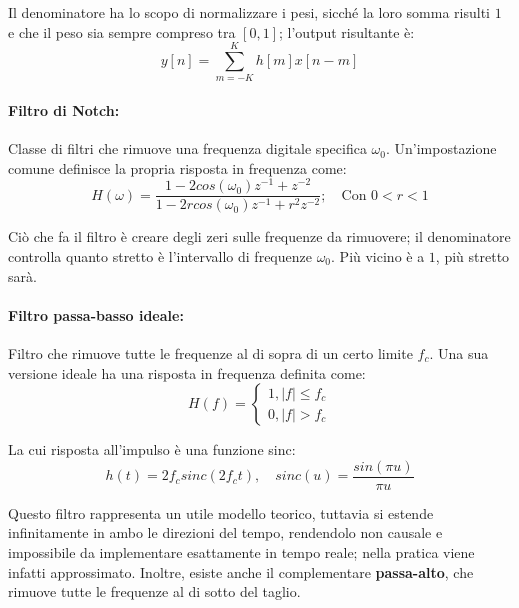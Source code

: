 \noindent Il denominatore ha lo scopo di normalizzare i pesi, sicché la loro somma risulti $1$ e che il peso sia sempre compreso tra $[0,1]$; l'output
risultante è: \[
	y[n] = \sum_{m = -K}^K h[m]x[n-m]
\]

\paragraph{Filtro di Notch:} Classe di filtri che rimuove una frequenza digitale specifica $\omega_0$. Un'impostazione comune definisce la propria
risposta in frequenza come: \[
	H(\omega) = \frac{1-2cos(\omega_0)z^{-1}+z^{-2}}{1-2rcos(\omega_0)z^{-1}+r^2z^{-2}};\quad \text{Con } 0 < r < 1
\]

\noindent Ciò che fa il filtro è creare degli zeri sulle frequenze da rimuovere; il denominatore controlla quanto stretto è l'intervallo di frequenze
$\omega_0$. Più vicino è a $1$, più stretto sarà.

\paragraph{Filtro passa-basso ideale:} Filtro che rimuove tutte le frequenze al di
sopra di un certo limite $f_c$. Una sua versione ideale ha una risposta in frequenza
definita come: \[
	H(f) = \begin{cases}
		1, |f| \leq f_c\\
		0, |f| > f_c
	\end{cases}
\]

\noindent La cui risposta all'impulso è una funzione sinc: \[
	h(t) = 2f_c sinc(2f_ct),\quad sinc(u) = \frac{sin(\pi u)}{\pi u}
\]

\noindent Questo filtro rappresenta un utile modello teorico, tuttavia si estende infinitamente in ambo le direzioni del tempo, rendendolo non causale
e impossibile da implementare esattamente in tempo reale; nella pratica viene infatti approssimato. Inoltre, esiste anche il complementare 
\textbf{passa-alto}, che rimuove tutte le frequenze al di sotto del taglio.

%

